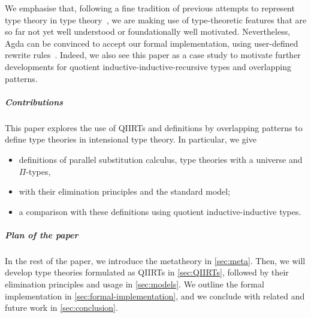 \documentclass[a4paper,UKenglish,numberwithinsect,cleveref,thm-restate]{lipics-v2021}
\begin{document}

%
We emphasise that, following a fine tradition of previous attempts to represent type theory in type theory~\cite{Danielsson2006,Chapman2009,Altenkirch2016a}, we are making use of type-theoretic features that are so far not yet well understood or foundationally well motivated.
Nevertheless, Agda can be convinced to accept our formal implementation, using user-defined rewrite rules~\cite{Cockx2020,Cockx2021}.
Indeed, we also see this paper as a case study to motivate further developments for quotient inductive-inductive-recursive types and overlapping patterns.

\subparagraph*{Contributions}
This paper explores the use of QIIRTs and definitions by overlapping patterns to define type theories in intensional type theory.
In particular, we give
\begin{itemize}
  \item definitions of parallel substitution calculus, type theories with a universe and $\Pi$-types,
  \item with their elimination principles and the standard model;
  \item a comparison with these definitions using quotient inductive-inductive types.
\end{itemize}

\subparagraph*{Plan of the paper}
In the rest of the paper, we introduce the metatheory in \cref{sec:meta}.
Then, we will develop type theories formulated as QIIRTs in \cref{sec:QIIRTs}, followed by their elimination principles and usage in \cref{sec:models}.
We outline the \Agda formal implementation in \cref{sec:formal-implementation}, and we conclude with related and future work in \cref{sec:conclusion}.
\end{document}
